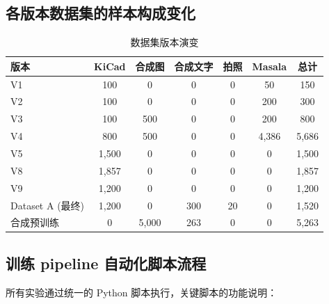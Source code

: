 \subsection{各版本数据集的样本构成变化}

\begin{table}[h]
\centering
\caption{数据集版本演变}
\scriptsize
\begin{tabular}{lcccccc}
\toprule
\textbf{版本} & \textbf{KiCad} & \textbf{合成图} & \textbf{合成文字} & \textbf{拍照} & \textbf{Masala} & \textbf{总计} \\
\midrule
V1 & 100 & 0 & 0 & 0 & 50 & 150 \\
V2 & 100 & 0 & 0 & 0 & 200 & 300 \\
V3 & 100 & 500 & 0 & 0 & 200 & 800 \\
V4 & 800 & 500 & 0 & 0 & 4,386 & 5,686 \\
V5 & 1,500 & 0 & 0 & 0 & 0 & 1,500 \\
V8 & 1,857 & 0 & 0 & 0 & 0 & 1,857 \\
V9 & 1,200 & 0 & 0 & 0 & 0 & 1,200 \\
Dataset A (最终) & 1,200 & 0 & 300 & 20 & 0 & 1,520 \\
合成预训练 & 0 & 5,000 & 263 & 0 & 0 & 5,263 \\
\bottomrule
\end{tabular}
\end{table}

\subsection{训练 pipeline 自动化脚本流程}

所有实验通过统一的 Python 脚本执行，关键脚本的功能说明：

